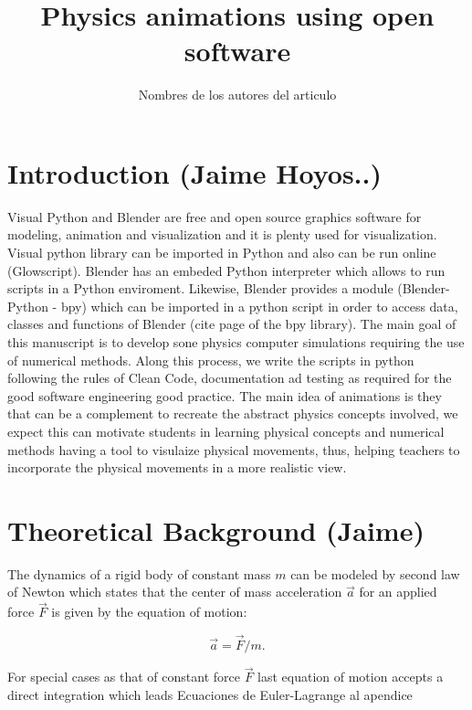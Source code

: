 \documentclass[12pt, letterpaper]{article}
\begin{document}
\title{Physics animations using open software}
\maketitle %
\author{Nombres de los autores del articulo}


\section{Introduction (Jaime Hoyos..)} 

Visual Python and Blender are free and open source graphics software for modeling, animation and visualization and it is plenty used for visualization. Visual python library can be imported in Python and also can be run online (Glowscript). Blender has an embeded Python interpreter which allows to run scripts in a Python enviroment. Likewise, Blender provides a module (Blender-Python - bpy) which can be imported in a python script in order to access data, classes and functions of Blender (cite page of the bpy library). The main goal of this manuscript is to develop sone physics computer simulations requiring the use of numerical methods. Along this process, we write the scripts in python following the rules of Clean Code, documentation ad testing as required for the good software engineering good practice. The main idea of animations is they that can be a complement to recreate the abstract physics concepts involved, we expect this can motivate students in learning physical concepts and numerical methods having a tool to visulaize physical movements, thus, helping teachers to incorporate the physical movements in a more realistic view.

\section{Theoretical Background (Jaime)}

The dynamics of a rigid body of constant mass $m$ can be modeled by second law of Newton which states that the center of mass acceleration $\vec{a}$ for an applied force $\vec{F}$ is given by the equation of motion:

\begin{equation}
\vec{a}=\vec{F}/m.
\end{equation}

For special cases as that of constant force $\vec{F}$ last equation of motion accepts a direct integration which leads 
Ecuaciones de Euler-Lagrange al apendice
\end{document}
